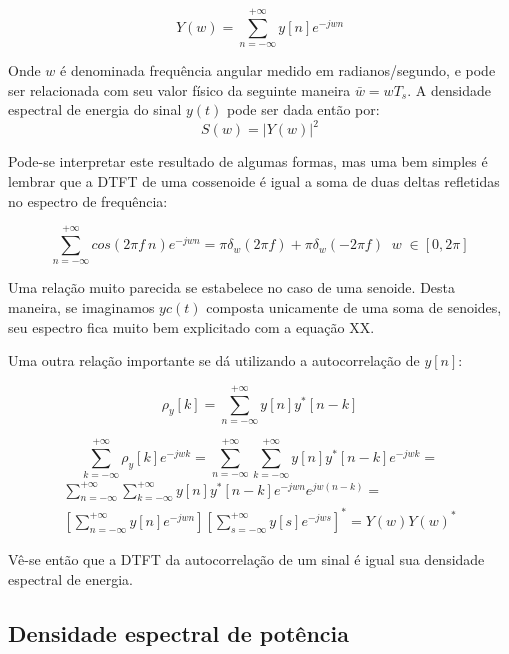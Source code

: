 \begin{equation}
Y(w)=\sum_{n=-\infty}^{+\infty}y[n]e^{-jwn}
\end{equation}

Onde $w$ é denominada frequência angular medido em radianos/segundo, e pode ser relacionada com seu valor físico da seguinte maneira $\bar{w}=wT_s$. A densidade espectral de energia do sinal $y(t)$ pode ser dada então por:
\begin{equation}
S(w)=|Y(w)|^2
\end{equation}

Pode-se interpretar este resultado de algumas formas, mas uma bem simples é lembrar que a DTFT de uma cossenoide é igual a soma de duas deltas refletidas no espectro de frequência:

\begin{equation}
\sum_{n=-\infty}^{+\infty}cos(2\pi f \: n)e^{-jwn}= \pi \delta_{w}(2\pi f) + \pi \delta_{w}(-2\pi f) \;\; w \; \in [0,2 \pi]
\end{equation}

Uma relação muito parecida se estabelece no caso de uma senoide. Desta maneira, se imaginamos $yc(t)$ composta unicamente de uma soma de senoides, seu espectro fica muito bem explicitado com a equação XX.

Uma outra relação importante se dá utilizando a autocorrelação de $y[n]$:

\begin{equation}
\rho_y[k]=\sum_{n=-\infty}^{+\infty}y[n]y^*[n-k]
\end{equation}

\begin{equation*}
\sum_{k=-\infty}^{+\infty}\rho_y[k]e^{-jwk}=\sum_{n=-\infty}^{+\infty}\sum_{k=-\infty}^{+\infty}y[n]y^*[n-k]e^{-jwk}=
\end{equation*}
\begin{equation}
\begin{aligned}
\sum_{n=-\infty}^{+\infty}\sum_{k=-\infty}^{+\infty}y[n]y^*[n-k]e^{-jwn}e^{jw(n-k)}  = \\ \left[\sum_{n=-\infty}^{+\infty}y[n]e^{-jwn} \right]  \left[\sum_{s=-\infty}^{+\infty}y[s]e^{-jws} \right]^* = Y(w)Y(w)^*
\end{aligned}
\end{equation}

Vê-se então que a DTFT da autocorrelação de um sinal é igual sua densidade espectral de energia.

\subsection{Densidade espectral de potência}

